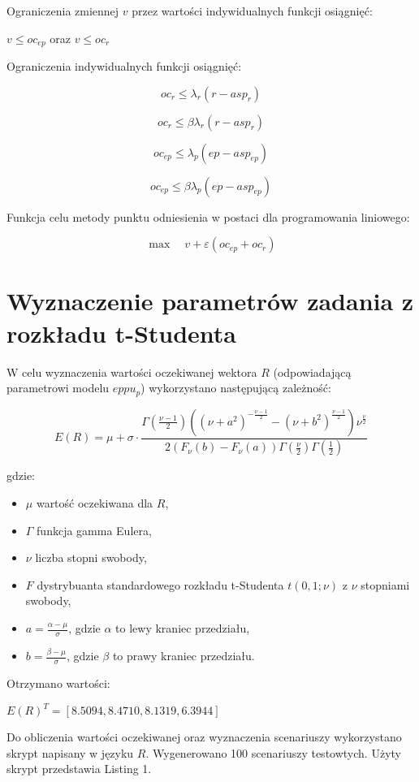 \documentclass{article}
\begin{document}
Ograniczenia zmiennej $v$ przez wartości indywidualnych funkcji osiągnięć:

$v \leq oc_{ep}$ oraz $v \leq oc_r$

Ograniczenia indywidualnych funkcji osiągnięć:

$$oc_r \leqslant \lambda_r (r - asp_r)$$

$$oc_r \leqslant \beta \lambda_r (r - asp_r)$$

$$oc_{ep} \leqslant \lambda_p (ep - asp_{ep})$$

$$oc_{ep} \leqslant \beta \lambda_p (ep - asp_{ep})$$

Funkcja celu metody punktu odniesienia w postaci dla programowania liniowego:

$$\max \quad v + \varepsilon (oc_{ep} + oc_r)$$

\section{Wyznaczenie parametrów zadania z rozkładu t-Studenta}

W celu wyznaczenia wartości oczekiwanej wektora $R$ (odpowiadającą parametrowi modelu $eppu_p$) wykorzystano następującą zależność:

$$E(R) = \mu + \sigma \cdot \frac{\Gamma(\frac{\nu - 1}{2})((\nu + a^2)^{-\frac{\nu - 1}{2}} - (\nu + b^2)^{\frac{\nu - 1}{2}})\nu^{\frac{\nu}{2}}}{2(F_{\nu}(b) - F_{\nu}(a))\Gamma(\frac{\nu}{2})\Gamma(\frac{1}{2})}$$

gdzie:

\begin{itemize}
\item $\mu$ wartość oczekiwana dla $R$,
\item $\Gamma$ funkcja gamma Eulera,
\item $\nu$ liczba stopni swobody,
\item $F$ dystrybuanta standardowego rozkładu t-Studenta $t(0, 1; \nu)$ z $\nu$ stopniami swobody,
\item $a = \frac{\alpha-\mu}{\sigma}$, gdzie $\alpha$ to lewy kraniec przedziału,
\item $b = \frac{\beta-\mu}{\sigma}$, gdzie $\beta$ to prawy kraniec przedziału.
\end{itemize}

Otrzymano wartości:

$E(R)^T = [8.5094, 8.4710, 8.1319, 6.3944]$

Do obliczenia wartości oczekiwanej oraz wyznaczenia scenariuszy wykorzystano skrypt napisany w języku $R$. Wygenerowano 100 scenariuszy testowtych. Użyty skrypt przedstawia Listing 1.
\end{document}
